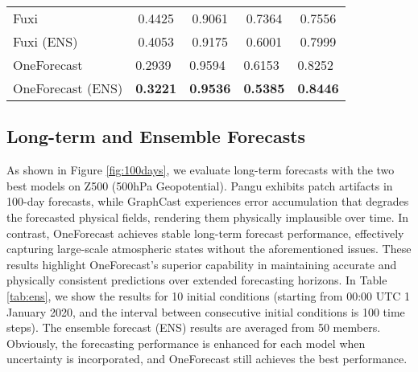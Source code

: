 \begin{table}[t]
\begin{small}
\begin{sc}
\begin{tabular}{l|cccc}
            Fuxi                   & 0.4425                     & \multicolumn{1}{c|}{0.9061} & 0.7364                     & 0.7556                     \\
            Fuxi (ENS)             & 0.4053                     & \multicolumn{1}{c|}{0.9175} & 0.6001                     & 0.7999                     \\ \midrule
            OneForecast            & \multicolumn{1}{l}{0.2939} & \multicolumn{1}{l|}{0.9594} & \multicolumn{1}{l}{0.6153} & \multicolumn{1}{l}{0.8252} \\
            OneForecast (ENS)      & \multicolumn{1}{l}{\textbf{0.3221}} & \multicolumn{1}{l|}{\textbf{0.9536}} & \multicolumn{1}{l}{\textbf{0.5385}} & \multicolumn{1}{l}{\textbf{0.8446}} \\
            \bottomrule
            \end{tabular}
                    \end{sc}
                \end{small}
\vspace{-6mm}
\end{table}
    

\subsection{Long-term and Ensemble Forecasts}
    As shown in Figure \ref{fig:100days}, we evaluate long-term forecasts with the two best models on Z500 (500hPa Geopotential). Pangu exhibits patch artifacts in 100-day forecasts, while GraphCast experiences error accumulation that degrades the forecasted physical fields, rendering them physically implausible over time. In contrast, OneForecast achieves stable long-term forecast performance, effectively capturing large-scale atmospheric states without the aforementioned issues. These results highlight OneForecast's superior capability in maintaining accurate and physically consistent predictions over extended forecasting horizons. In Table \ref{tab:ens}, we show the results for 10 initial conditions (starting from 00:00 UTC 1 January 2020, and the interval between consecutive initial conditions is 100 time steps). The ensemble forecast (ENS) results are averaged from 50 members. Obviously, the forecasting performance is enhanced for each model when uncertainty is incorporated, and OneForecast still achieves the best performance.

